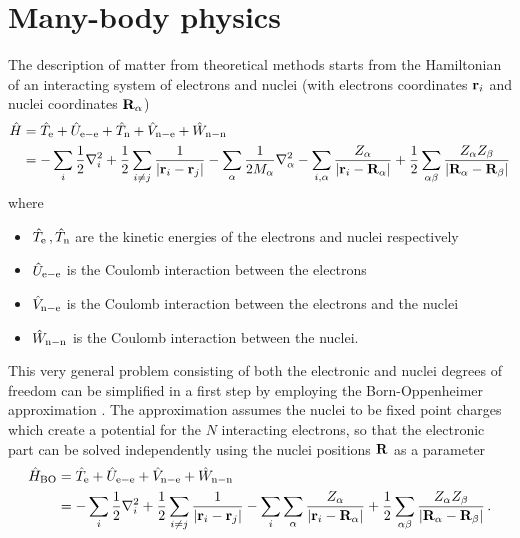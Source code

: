 \documentclass[main.tex]{subfiles}
\begin{document}
\chapter{Many-body physics\label{chap:many-body-physics}}


The description of matter from theoretical methods starts from the Hamiltonian of an interacting system of electrons and nuclei (with electrons coordinates \(\vb{r}_i\) and nuclei coordinates \(\vb{R}_{\alpha}\))
\begin{align}
    \hat{H} &= \hat{T}_{\mathrm{e}} + \hat{U}_{\mathrm{e-e}} + \hat{T}_{\mathrm{n}} + \hat{V}_{\mathrm{n-e}} + \hat{W}_{\mathrm{n-n}} \\
    &= - \sum_i \frac{1}{2} \nabla^2_i 
    + \frac{1}{2} \sum_{i \neq j} \frac{1}{\vert \vb{r}_i - \vb{r}_j \vert} 
    - \sum_{\alpha} \frac{1}{2 M_{\alpha}} \nabla^2_{\alpha}
    - \sum_{i, \alpha} \frac{Z_{\alpha}}{\vert \vb{r}_i - \vb{R}_{\alpha} \vert} 
    + \frac{1}{2} \sum_{\alpha \beta} \frac{Z_{\alpha} Z_{\beta}}{\vert \vb{R}_{\alpha} - \vb{R}_{\beta} \vert}
\end{align}
where
\begin{itemize}
    \item \(\hat{T}_{\mathrm{e}}\,, \hat{T}_{\mathrm{n}}\) are the kinetic energies of the electrons and nuclei respectively
    \item \(\hat{U}_{\mathrm{e-e}}\) is the Coulomb interaction between the electrons
    \item \(\hat{V}_{\mathrm{n-e}}\) is the Coulomb interaction between the electrons and the nuclei
    \item \(\hat{W}_{\mathrm{n-n}}\) is the Coulomb interaction between the nuclei.
\end{itemize}
This very general problem consisting of both the electronic and nuclei degrees of freedom can be simplified in a first step by employing the Born-Oppenheimer approximation \cite{born_zur_1927}.
The approximation assumes the nuclei to be fixed point charges which create a potential for the \(N\) interacting electrons, so that the electronic part can be solved independently using the nuclei positions \(\vb{R}\) as a parameter
\begin{align}
    \hat{H}_{\mathrm{BO}} &= \hat{T}_{\mathrm{e}} + \hat{U}_{\mathrm{e-e}} + \hat{V}_{\mathrm{n-e}} + \hat{W}_{\mathrm{n-n}} \\
    &= -\sum_i \frac{1}{2} \nabla^2_i 
    + \frac{1}{2} \sum_{i \neq j} \frac{1}{\vert \vb{r}_i - \vb{r}_j \vert} 
    - \sum_i \sum_{\alpha} \frac{Z_{\alpha}}{\vert \vb{r}_i 
    - \vb{R}_{\alpha} \vert} 
    + \frac{1}{2} \sum_{\alpha \beta} \frac{Z_{\alpha} Z_{\beta}}{\vert \vb{R}_{\alpha} - \vb{R}_{\beta} \vert}\,. \label{eq:bo_hamiltonian}
\end{align}
\end{document}
